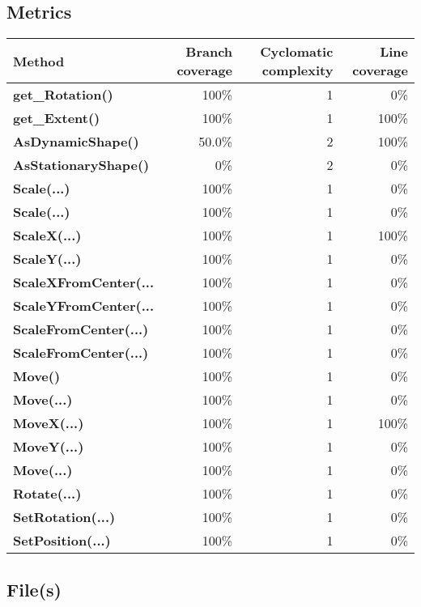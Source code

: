 \documentclass[a4paper,landscape,10pt]{article}
\begin{document}
\subsection{Metrics}
\begin{longtable}[l]{|l|r|r|r|}
\hline
\textbf{Method} & \textbf{Branch coverage} & \textbf{Cyclomatic complexity} & \textbf{Line coverage}\\
\hline
\textbf{get\_Rotation()} & 100\% & 1 & 0\%\\
\hline
\textbf{get\_Extent()} & 100\% & 1 & 100\%\\
\hline
\textbf{AsDynamicShape()} & 50.0\% & 2 & 100\%\\
\hline
\textbf{AsStationaryShape()} & 0\% & 2 & 0\%\\
\hline
\textbf{Scale(...)} & 100\% & 1 & 0\%\\
\hline
\textbf{Scale(...)} & 100\% & 1 & 0\%\\
\hline
\textbf{ScaleX(...)} & 100\% & 1 & 100\%\\
\hline
\textbf{ScaleY(...)} & 100\% & 1 & 0\%\\
\hline
\textbf{ScaleXFromCenter(...} & 100\% & 1 & 0\%\\
\hline
\textbf{ScaleYFromCenter(...} & 100\% & 1 & 0\%\\
\hline
\textbf{ScaleFromCenter(...)} & 100\% & 1 & 0\%\\
\hline
\textbf{ScaleFromCenter(...)} & 100\% & 1 & 0\%\\
\hline
\textbf{Move()} & 100\% & 1 & 0\%\\
\hline
\textbf{Move(...)} & 100\% & 1 & 0\%\\
\hline
\textbf{MoveX(...)} & 100\% & 1 & 100\%\\
\hline
\textbf{MoveY(...)} & 100\% & 1 & 0\%\\
\hline
\textbf{Move(...)} & 100\% & 1 & 0\%\\
\hline
\textbf{Rotate(...)} & 100\% & 1 & 0\%\\
\hline
\textbf{SetRotation(...)} & 100\% & 1 & 0\%\\
\hline
\textbf{SetPosition(...)} & 100\% & 1 & 0\%\\
\hline
\end{longtable}
\subsection{File(s)}
\end{document}
